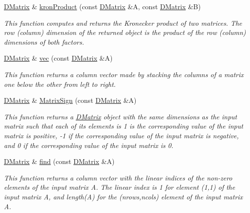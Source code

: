 \begin{DoxyCompactItemize}
\hyperlink{classDMatrix}{DMatrix} \& \hyperlink{classDMatrix_adc052c1c9f76c909347b83f662fb5952}{kronProduct} (const \hyperlink{classDMatrix}{DMatrix} \&A, const \hyperlink{classDMatrix}{DMatrix} \&B)
\begin{DoxyCompactList}\small\item\em This function computes and returns the Kronecker product of two matrices. The row (column) dimension of the returned object is the product of the row (column) dimensions of both factors. \item\end{DoxyCompactList}\item 
\hyperlink{classDMatrix}{DMatrix} \& \hyperlink{classDMatrix_a643b82daee87c5738faac272b56e8ea8}{vec} (const \hyperlink{classDMatrix}{DMatrix} \&A)
\begin{DoxyCompactList}\small\item\em This function returns a column vector made by stacking the columns of a matrix one below the other from left to right. \item\end{DoxyCompactList}\item 
\hyperlink{classDMatrix}{DMatrix} \& \hyperlink{classDMatrix_a5fef948be5e07507f9e0c9cc11e6cd09}{MatrixSign} (const \hyperlink{classDMatrix}{DMatrix} \&A)
\begin{DoxyCompactList}\small\item\em This function returns a \hyperlink{classDMatrix}{DMatrix} object with the same dimensions as the input matrix such that each of its elements is 1 is the corresponding value of the input matrix is positive, -\/1 if the corresponding value of the input matrix is negative, and 0 if the corresponding value of the input matrix is 0. \item\end{DoxyCompactList}\item 
\hyperlink{classDMatrix}{DMatrix} \& \hyperlink{classDMatrix_addd401503db0026290c74a9ae860ba6a}{find} (const \hyperlink{classDMatrix}{DMatrix} \&A)
\begin{DoxyCompactList}\small\item\em This function returns a column vector with the linear indices of the non-\/zero elements of the input matrix A. The linear index is 1 for element (1,1) of the input matrix A, and length(A) for the (nrows,ncols) element of the input matrix A. \item\end{DoxyCompactList}\item 

\end{DoxyCompactItemize}
